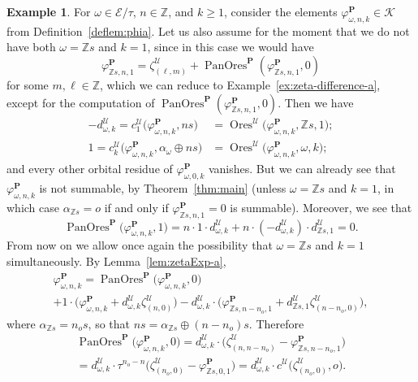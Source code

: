 \documentclass[preprint,12pt]{elsarticle}
\numberwithin{equation}{section} %
\theoremstyle{theorem}
\theoremstyle{definition}
\newtheorem{example}[theorem]{Example}
\newcommand{\bk}{\mathcal{K}} %
\newcommand{\ec}{\mathcal{E}} %
\newcommand{\idec}{{o}} %
\newcommand{\orbita}{{\ec/\tau}} %
\newcommand{\Z}{\mathbb{Z}} %
\newcommand{\za}[2]{\zeta^{\mathcal{U}}_{( {#1} , {#2} )}}
\DeclareMathOperator{\ores}{Ores}
\DeclareMathOperator{\pano}{PanOres}
\begin{document}
 \begin{example}\label{ex:phi-a}
    For $\omega\in\orbita$, $n\in\Z$, and $k\geq 1$, consider the elements $\varphi^\mathbf{P}_{\omega,n,k}\in\bk$ from Definition~\ref{deflem:phia}. Let us also assume for the moment that we do not have both $\omega=\Z s$ and $k=1$, since in this case we would have \[\varphi^\mathbf{P}_{\Z s,n,1}=\za{\ell}{m}+\pano^\mathbf{P}(\varphi^\mathbf{P}_{\Z s,n,1},0)\] for some $m,\ell\in\Z$, which we can reduce to Example~\ref{ex:zeta-difference-a}, except for the computation of $\pano^\mathbf{P}(\varphi^\mathbf{P}_{\Z s,n,1},0)$. Then we have \begin{align*}-d^\mathcal{U}_{\omega,k}=c_1^\mathcal{U}\bigl(\varphi^\mathbf{P}_{\omega,n,k},ns\bigr)&=\ores^\mathcal{U}\bigl(\varphi^\mathbf{P}_{\omega,n,k},\Z s,1);\\
1=c^\mathcal{U}_k\bigl(\varphi^\mathbf{P}_{\omega,n,k},\alpha_\omega\oplus ns\bigr)&=\ores^\mathcal{U}\bigl(\varphi^\mathbf{P}_{\omega,n,k},\omega,k\bigr);
    \end{align*} and every other orbital residue of $\varphi^\mathbf{P}_{\omega,0,k}$ vanishes. But we can already see that $\varphi^\mathbf{P}_{\omega,n,k}$ is not summable, by Theorem~\ref{thm:main} (unless $\omega=\Z s$ and $k=1$, in which case $\alpha_{\Z s}=\idec$ if and only if $\varphi^\mathbf{P}_{\Z s,n,1}=0$ is summable). Moreover, we see that \[\pano^\mathbf{P}\bigl(\varphi^\mathbf{P}_{\omega,n,k},1)=n\cdot1\cdot d^\mathcal{U}_{\omega,k}+n\cdot(-d^\mathcal{U}_{\omega,k})\cdot d^\mathcal{U}_{\Z s,1}=0.\] From now on we allow once again the possibility that $\omega=\Z s$ and $k=1$ simultaneously. By Lemma~\ref{lem:zetaExp-a}, \begin{multline*}\varphi^\mathbf{P}_{\omega,n,k}=\pano^\mathbf{P}\bigl(\varphi^\mathbf{P}_{\omega,n,k},0\bigr)\\ +1\cdot\bigl(\varphi^\mathbf{P}_{\omega,n,k}+d^\mathcal{U}_{\omega,k}\za{n}{0}\bigr)-d^\mathcal{U}_{\omega,k}\cdot\bigl(\varphi^\mathbf{P}_{\Z s,n-n_\idec,1}+d^\mathcal{U}_{\Z s,1}\za{n-n_\idec}{0}\bigr),\end{multline*} where $\alpha_{\Z s}=n_\idec s$, so that $ns=\alpha_{\Z s}\oplus (n-n_\idec)s$. Therefore \begin{multline*}\pano^\mathbf{P}\bigl(\varphi^\mathbf{P}_{\omega,n,k},0\bigr)=d^\mathcal{U}_{\omega,k}\cdot\bigl(\za{n}{n-n_\idec}-\varphi^\mathbf{P}_{\Z s,n-n_\idec,1}\bigr)\\=d^\mathcal{U}_{\omega,k}\cdot\tau^{n_\idec-n}\bigl(\za{n_\idec}{0}-\varphi^\mathbf{P}_{\Z s,0,1}\bigr)=d^\mathcal{U}_{\omega,k}\cdot c^\mathcal{U}\bigl(\za{n_\idec}{0},\idec\bigr).\end{multline*}
\end{example}
\end{document}
